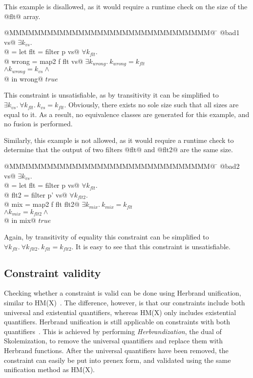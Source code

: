 This example is disallowed, as it would require a runtime check on the size of the @flt@ array.
\begin{tabbing}
@MMMMMMMMMMMMMMMMMMMMMMMMMMMMMMMM@  \= \kill
@bad1 vs@                           \> $\exists k_{vs}.$ \\
@ = let flt   = filter p vs@        \> $\forall k_{flt}.$ \\
@       wrong = map2   f flt vs@    \> $\exists k_{wrong}.\ k_{wrong} = k_{flt}$ \\
                                    \> $\wedge k_{wrong} = k_{vs} \wedge$ \\
@   in  wrong@                      \> $true$
\end{tabbing}
This constraint is unsatisfiable, as by transitivity it can be simplified to $\exists k_{vs}.\ \forall k_{flt}.\ k_{vs} = k_{flt}$.
Obviously, there exists no sole size such that all sizes are equal to it.
As a result, no equivalence classes are generated for this example, and no fusion is performed.


Similarly, this example is not allowed, as it would require a runtime check to determine that the output of two filters @flt@ and @flt2@ are the same size.
\begin{tabbing}
@MMMMMMMMMMMMMMMMMMMMMMMMMMMMMMMM@  \= \kill
@bad2 vs@                           \> $\exists k_{vs}.$ \\
@ = let flt  = filter p  vs@        \> $\forall k_{flt}.$ \\
@       flt2 = filter p' vs@        \> $\forall k_{flt2}.$ \\
@       mix  = map2   f  flt flt2@  \> $\exists k_{mix}.\ k_{mix} = k_{flt}$ \\
                                    \> $\wedge k_{mix} = k_{flt2} \wedge$ \\
@   in  mix@                        \> $true$                               \\
\end{tabbing}
Again, by transitivity of equality this constraint can be simplified to $\forall k_{flt}.\ \forall k_{flt2}.\ k_{flt} = k_{flt2}$.
It is easy to see that this constraint is unsatisfiable.

\subsection{Constraint validity}
Checking whether a constraint is valid can be done using Herbrand unification, similar to HM(X)~\cite{odersky1999type}.
The difference, however, is that our constraints include both universal and existential quantifiers, whereas HM(X) only includes existential quantifiers.
Herbrand unification is still applicable on constraints with both quantifiers~\cite{buss1995herbrand}.
This is achieved by performing \emph{Herbrandization}, the dual of Skolemization, to remove the universal quantifiers and replace them with Herbrand functions.
After the universal quantifiers have been removed, the constraint can easily be put into prenex form, and validated using the same unification method as HM(X).

